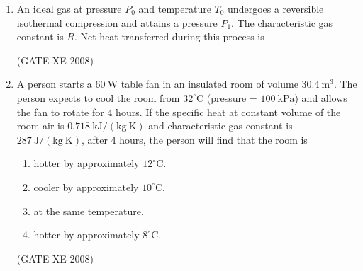 \documentclass[12pt]{article}
\begin{document}
\begin{enumerate}
\begin{enumerate}
\end{enumerate}

(GATE XE 2008)

\item An ideal gas at pressure $P_0$ and temperature $T_0$ undergoes a reversible isothermal compression and attains a pressure $P_1$. The characteristic gas constant is $R$. Net heat transferred during this process is  

\begin{enumerate}
\end{enumerate}

(GATE XE 2008)

\item A person starts a $60\ \mathrm{W}$ table fan in an insulated room of volume $30.4\ \mathrm{m^3}$. The person expects to cool the room from $32^\circ\mathrm{C}$ (pressure = $100\ \mathrm{kPa}$) and allows the fan to rotate for $4$ hours. If the specific heat at constant volume of the room air is $0.718\ \mathrm{kJ/(kg\ K)}$ and characteristic gas constant is $287\ \mathrm{J/(kg\ K)}$, after 4 hours, the person will find that the room is  

\begin{enumerate}
\item  hotter by approximately $12^\circ$C.
\item  cooler by approximately $10^\circ$C.
\item  at the same temperature.
\item  hotter by approximately $8^\circ$C.
\end{enumerate}

(GATE XE 2008)


\end{enumerate}
\end{document}
